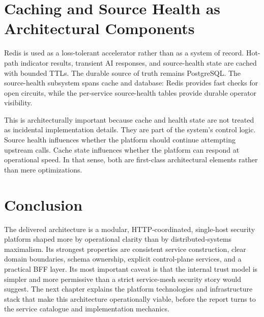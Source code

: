 \section{Caching and Source Health as Architectural Components}
Redis is used as a loss-tolerant accelerator rather than as a system of record. Hot-path indicator results, transient AI responses, and source-health state are cached with bounded TTLs. The durable source of truth remains PostgreSQL. The source-health subsystem spans cache and database: Redis provides fast checks for open circuits, while the per-service source-health tables provide durable operator visibility.

This is architecturally important because cache and health state are not treated as incidental implementation details. They are part of the system's control logic. Source health influences whether the platform should continue attempting upstream calls. Cache state influences whether the platform can respond at operational speed. In that sense, both are first-class architectural elements rather than mere optimizations.

\section*{Conclusion}
The delivered architecture is a modular, HTTP-coordinated, single-host security platform shaped more by operational clarity than by distributed-systems maximalism. Its strongest properties are consistent service construction, clear domain boundaries, schema ownership, explicit control-plane services, and a practical BFF layer. Its most important caveat is that the internal trust model is simpler and more permissive than a strict service-mesh security story would suggest. The next chapter explains the platform technologies and infrastructure stack that make this architecture operationally viable, before the report turns to the service catalogue and implementation mechanics.
